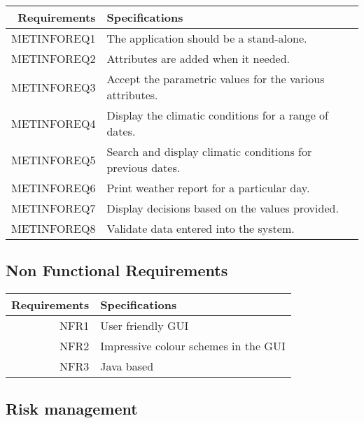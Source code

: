 \documentclass{article}
\begin{document}
\begin{center}
\begin{tabular}{|r|l|}

\hline
Requirements & Specifications\\[5pt]
\hline

METINFOREQ1 &
The application should be a stand-alone. 
\\\hline

METINFOREQ2 &
Attributes are added when it needed.
\\\hline

METINFOREQ3&
Accept the parametric values for the various attributes.
\\\hline

METINFOREQ4&
Display the climatic conditions for a range of dates.
\\\hline

METINFOREQ5&
Search and display climatic conditions for previous dates.
\\\hline

METINFOREQ6&
Print weather report for a particular day. 
\\\hline

METINFOREQ7&
Display decisions based on the values provided.
\\\hline

METINFOREQ8&
Validate data entered into the system.
\\\hline
\end{tabular}
\end{center}

\subsection{Non Functional Requirements}

\begin{tabular}{|r|l|}

\hline
Requirements & Specifications\\[5pt]
\hline
NFR1&
User friendly GUI
\\\hline

NFR2&
Impressive colour schemes in the GUI
\\\hline

NFR3&
Java based
\\\hline

\end{tabular}

\subsection{Risk management}
\label{sec:riskman}
\pagebreak





\end{document}
